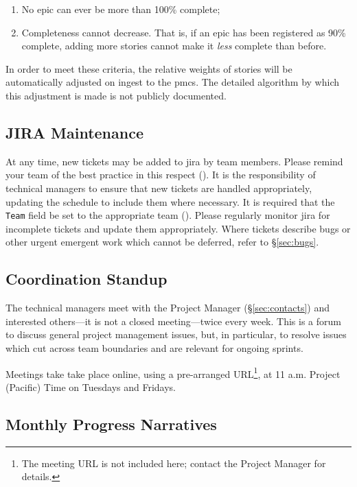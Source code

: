 \begin{enumerate}
\item
  No \gls{epic} can ever be more than 100\% complete;
\item
  Completeness cannot decrease.
  That is, if an \gls{epic} has been registered as 90\% complete, adding more stories cannot make it \emph{less} complete than before.
\end{enumerate}

In order to meet these criteria, the relative weights of stories will be automatically adjusted on ingest to the \gls{pmcs}.
The detailed algorithm by which this adjustment is made is not publicly documented.

\subsection{JIRA Maintenance}
\label{sec:jira-maintenance}

At any time, new tickets may be added to \gls{jira} by team members.
Please remind your team of the best practice in this respect ().
It is the responsibility of technical managers to ensure that new tickets are handled appropriately, updating the schedule to include them where necessary.
It is required that the \texttt{Team} field be set to the appropriate team ().
Please regularly monitor \gls{jira} for incomplete tickets and update them appropriately.
Where tickets describe bugs or other urgent emergent work which cannot be deferred, refer to \S\ref{sec:bugs}.

\subsection{Coordination Standup}
\label{sec:sup}

The technical managers meet with the Project Manager (\S\ref{sec:contacts}) and interested others---it is not a closed meeting---twice every week.
This is a forum to discuss general project management issues, but, in particular, to resolve issues which cut across team boundaries and are relevant for ongoing sprints.

Meetings take take place online, using a pre-arranged URL\footnote{The meeting URL is not included here; contact the Project Manager for details.}, at 11 a.m. Project (Pacific) Time on Tuesdays and Fridays.

\subsection{Monthly Progress Narratives}
\label{sec:monthly-narrative}

